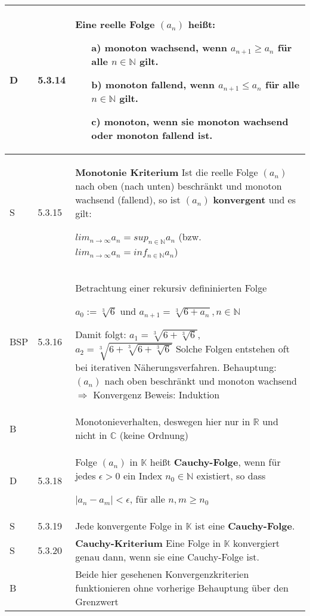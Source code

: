     \begin{longtable}{p{0.75cm} p{1cm} p{16cm}}
        \toprule
        
        D   & 5.3.14&   Eine reelle Folge $(a_n)$ heißt:
                            \begin{itemize}[topsep=-0.5cm]
                                \item[a)] \textbf{monoton wachsend}, wenn $a_{n+1} \geq a_n$ für alle $n \in \mathbb{N}$ gilt.
                                \item[b)] \textbf{monoton fallend}, wenn $a_{n+1} \leq a_n$ für alle $n \in \mathbb{N}$ gilt.
                                \item[c)] \textbf{monoton}, wenn sie monoton wachsend oder monoton fallend ist. 
                            \end{itemize} \vspace{-0cm} \\
        \midrule
        S   & 5.3.15&   \textbf{Monotonie Kriterium} \hfill \break
                        Ist die reelle Folge $(a_n)$ nach oben (nach unten) beschränkt und monoton wachsend (fallend), so ist $(a_n)$ \textbf{konvergent}
                        und es gilt: \hfill \break
                        \centerline{$lim_{n \rightarrow \infty} a_n = sup_{n \in \mathbb{N}}a_n$ (bzw. $lim_{n \rightarrow \infty} a_n = inf_{n \in \mathbb{N}}a_n$) } \\
        \midrule
        BSP & 5.3.16&   Betrachtung einer rekursiv defininierten Folge \hfill \break
                        \centerline{$a_0 := \sqrt[3]{6}$ und $a_{n+1} = \sqrt[3]{6 + a_n}, n \in \mathbb{N}$} 
                        Damit folgt: $a_1 = \sqrt[3]{6+\sqrt[3]{6}}$, $a_2 = \sqrt[3]{6+\sqrt[3]{6+\sqrt[3]{6}}}$ \hfill \break
                        Solche Folgen entstehen oft bei iterativen Näherungsverfahren. \hfill \break
                        Behauptung: $(a_n)$ nach oben beschränkt und monoton wachsend $\Rightarrow$ Konvergenz \hfill \break
                        Beweis: Induktion  \\
        \midrule
        B   &       &   Monotonieverhalten, deswegen hier nur in $\mathbb{R}$ und nicht in $\mathbb{C}$ (keine Ordnung) \\
        \midrule
        D   & 5.3.18&   Folge $(a_n)$ in $\mathbb{K}$ heißt \textbf{Cauchy-Folge}, wenn für jedes $\epsilon > 0$ ein Index
                        $n_0 \in \mathbb{N}$ existiert, so dass\hfill \break
                        \centerline{$|a_n - a_m| < \epsilon$, für alle $n,m \geq n_0$} \\
        S   & 5.3.19    & Jede konvergente Folge in $\mathbb{K}$ ist eine \textbf{Cauchy-Folge}. \\
        \midrule
        S   & 5.3.20&   \textbf{Cauchy-Kriterium} \hfill \break
                        Eine Folge in $\mathbb{K}$ konvergiert genau dann, wenn sie eine Cauchy-Folge ist. \\
        \midrule
        B   &       &   Beide hier gesehenen Konvergenzkriterien funktionieren ohne vorherige Behauptung über den Grenzwert \\               
        \bottomrule

    \end{longtable}

